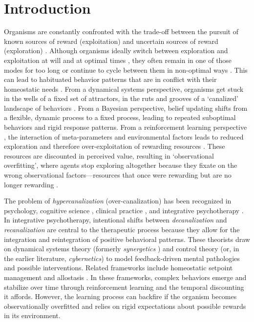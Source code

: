 \section{Introduction}

Organisms are constantly confronted with the trade-off between the pursuit of known sources of reward (exploitation) and uncertain sources of reward (exploration) \cite{stephens_foraging_1986}. Although organisms ideally switch between exploration and exploitation at will and at optimal times \cite{pearson_decision_2014}, they often remain in one of those modes for too long or continue to cycle between them in non-optimal ways \cite{barack_neurocomputational_2016, addicott_primer_2017}. This can lead to habituated behavior patterns that are in conflict with their homeostatic needs \cite{bernard_lectures_1974}. From a dynamical systems perspective, organisms get stuck in the wells of a fixed set of attractors, in the ruts and grooves of a ‘canalized’ landscape of behaviors \cite{waddington_canalization_1959, carhart-harris_canalization_2023}. From a Bayesian perspective, belief updating shifts from a flexible, dynamic process to a fixed process, leading to repeated suboptimal behaviors \cite{harle_anhedonia_2017} and rigid response patterns. From a reinforcement learning perspective \cite{sutton_reinforcement_1998}, the interaction of meta-parameters and environmental factors leads to reduced exploration and therefore over-exploitation of rewarding resources \cite{huys_mapping_2013}. These resources are discounted in perceived value, resulting in ‘observational overfitting’, where agents stop exploring altogether because they fixate on the wrong observational factors—resources that once were rewarding but are no longer rewarding \cite{song_observational_2019}.

The problem of \emph{hypercanalization} (over-canalization) has been recognized in psychology, cognitive science \cite{lloyd_understanding_2023}, clinical practice \cite{addicott_primer_2017}, and integrative psychotherapy \cite{schiepek_self-organization_2014, schiepek_integrative_2015, schiepek_psychotherapy_2017}. In integrative psychotherapy, intentional shifts between \emph{decanalization} and \emph{recanalization} are central to the therapeutic process because they allow for the integration and reintegration of positive behavioral patterns. These theorists draw on dynamical systems theory (formerly \emph{synergetics} \cite{haken_synergetics_1977}) and control theory \cite{wiener_cybernetics_2019} (or, in the earlier literature, \emph{cybernetics}) to model feedback-driven mental pathologies and possible interventions. Related frameworks include homeostatic setpoint management \cite{keramati_homeostatic_2014} and allostasis \cite{sterling_allostasis_1988, sterling_allostasis_2012}. In these frameworks, complex behaviors emerge and stabilize over time through reinforcement learning \cite{keramati_homeostatic_2014} and the temporal discounting it affords. However, the learning process can backfire if the organism becomes observationally overfitted and relies on rigid expectations about possible rewards in its environment.

